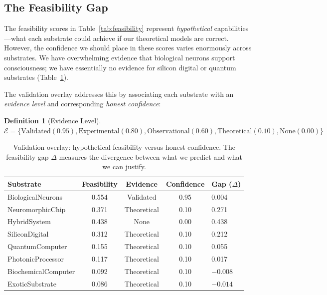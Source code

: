 \documentclass[12pt,a4paper]{article}
\newtheorem{definition}{Definition}
\begin{document}
\subsection{The Feasibility Gap}

The feasibility scores in Table~\ref{tab:feasibility} represent \emph{hypothetical} capabilities---what each substrate could achieve if our theoretical models are correct. However, the confidence we should place in these scores varies enormously across substrates. We have overwhelming evidence that biological neurons support consciousness; we have essentially no evidence for silicon digital or quantum substrates (Table~\ref{tab:validation}).

The validation overlay addresses this by associating each substrate with an \emph{evidence level} and corresponding \emph{honest confidence}:

\begin{definition}[Evidence Level]
$\mathcal{E} = \{\text{Validated}(0.95), \text{Experimental}(0.80), \text{Observational}(0.60), \text{Theoretical}(0.10), \text{None}(0.00)\}$
\end{definition}

\begin{table}[H]
\centering
\caption{Validation overlay: hypothetical feasibility versus honest confidence. The feasibility gap $\Delta$ measures the divergence between what we predict and what we can justify.}
\label{tab:validation}
\begin{tabular}{lcccl}
\toprule
\textbf{Substrate} & \textbf{Feasibility} & \textbf{Evidence} & \textbf{Confidence} & \textbf{Gap ($\Delta$)} \\
\midrule
BiologicalNeurons & 0.554 & Validated & 0.95 & 0.004 \\
NeuromorphicChip & 0.371 & Theoretical & 0.10 & 0.271 \\
HybridSystem & 0.438 & None & 0.00 & 0.438 \\
SiliconDigital & 0.312 & Theoretical & 0.10 & 0.212 \\
QuantumComputer & 0.155 & Theoretical & 0.10 & 0.055 \\
PhotonicProcessor & 0.117 & Theoretical & 0.10 & 0.017 \\
BiochemicalComputer & 0.092 & Theoretical & 0.10 & $-0.008$ \\
ExoticSubstrate & 0.086 & Theoretical & 0.10 & $-0.014$ \\
\bottomrule
\end{tabular}
\end{table}
\end{document}
